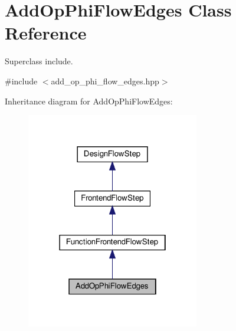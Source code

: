 \hypertarget{classAddOpPhiFlowEdges}{}\section{Add\+Op\+Phi\+Flow\+Edges Class Reference}
\label{classAddOpPhiFlowEdges}


Superclass include.  




{\ttfamily \#include $<$add\+\_\+op\+\_\+phi\+\_\+flow\+\_\+edges.\+hpp$>$}



Inheritance diagram for Add\+Op\+Phi\+Flow\+Edges\+:
\nopagebreak
\begin{figure}[H]
\begin{center}
\leavevmode
\includegraphics[width=214pt]{d0/daf/classAddOpPhiFlowEdges__inherit__graph}
\end{center}
\end{figure}


